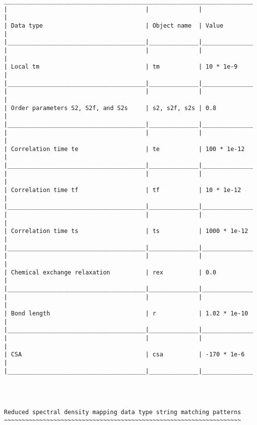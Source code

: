 {\begin{verbatim}
_______________________________________________________________________________________
|                                       |              |                              |
| Data type                             | Object name  | Value                        |
|_______________________________________|______________|______________________________|
|                                       |              |                              |
| Local tm                              | tm           | 10 * 1e-9                    |
|_______________________________________|______________|______________________________|
|                                       |              |                              |
| Order parameters S2, S2f, and S2s     | s2, s2f, s2s | 0.8                          |
|_______________________________________|______________|______________________________|
|                                       |              |                              |
| Correlation time te                   | te           | 100 * 1e-12                  |
|_______________________________________|______________|______________________________|
|                                       |              |                              |
| Correlation time tf                   | tf           | 10 * 1e-12                   |
|_______________________________________|______________|______________________________|
|                                       |              |                              |
| Correlation time ts                   | ts           | 1000 * 1e-12                 |
|_______________________________________|______________|______________________________|
|                                       |              |                              |
| Chemical exchange relaxation          | rex          | 0.0                          |
|_______________________________________|______________|______________________________|
|                                       |              |                              |
| Bond length                           | r            | 1.02 * 1e-10                 |
|_______________________________________|______________|______________________________|
|                                       |              |                              |
| CSA                                   | csa          | -170 * 1e-6                  |
|_______________________________________|______________|______________________________|




Reduced spectral density mapping data type string matching patterns
~~~~~~~~~~~~~~~~~~~~~~~~~~~~~~~~~~~~~~~~~~~~~~~~~~~~~~~~~~~~~~~~~~~


\end{verbatim}}
